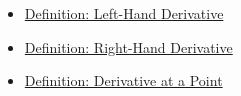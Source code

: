 \begin{dependencies}
\begin{itemize}
  \item \hyperref[def:left-hand-derivative]{Definition: Left-Hand Derivative}
  \item \hyperref[def:right-hand-derivative]{Definition: Right-Hand Derivative}
  \item \hyperref[def:derivative-at-a-point]{Definition: Derivative at a Point}
\end{itemize}
\end{dependencies}
